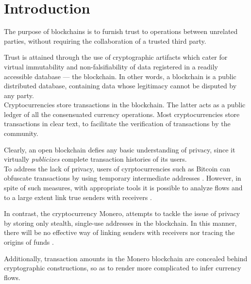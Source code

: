 

\chapter{Introduction}
\label{chap:introduction}

The purpose of blockchains is to furnish trust to operations between unrelated parties, without requiring the collaboration of a trusted third party.

Trust is attained through the use of cryptographic artifacts which cater for virtual immutability and non-falsifiability of data registered in a readily accessible database --- the blockchain.
In other words, a blockchain is a public distributed database, containing data whose legitimacy cannot 
be disputed by any party.
\\

Cryptocurrencies store transactions in the blockchain. The latter acts as a public ledger of all the consensuated currency operations. Most cryptocurrencies store transactions in clear text, to facilitate the verification of transactions by the community.

Clearly, an open blockchain defies any basic understanding of privacy, since it virtually 
{\em publicizes} complete transaction histories of its users. 
\\

To address the lack of privacy, users of cyrptocurrencies such as Bitcoin can obfuscate transactions by using temporary intermediate addresses \cite{DBLP:journals/corr/NarayananM17}. However, in spite of such measures, with appropriate tools it is possible to analyze flows and to a large extent 
link true senders with receivers \cite{DBLP:journals/corr/ShenTuY15b, DK-police-tracing-btc, Andrew-Cox-Sandia}.

In contrast, the cryptocurrency Monero, attempts to tackle the issue of privacy by storing only stealth, single-use addresses in the blockchain. In this manner, there will be no effective way of linking senders with receivers nor tracing the origins of funds \cite{Monero-intro}.

Additionally, transaction amounts in the Monero blockchain are concealed behind cryptographic constructions, so as to render more complicated to infer currency flows.

